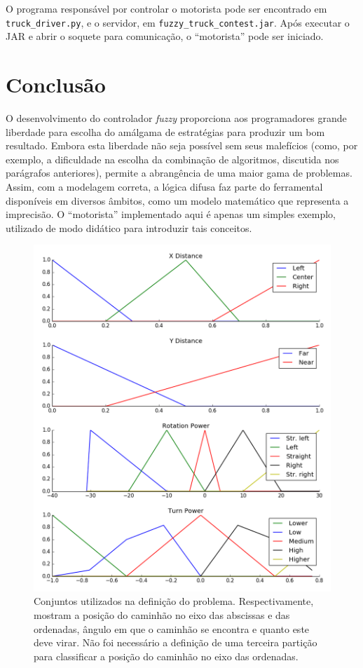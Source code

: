 \documentclass{article}
\begin{document}
O programa responsável por controlar o motorista pode ser encontrado em
\texttt{truck\_driver.py}, e o servidor, em \texttt{fuzzy\_truck\_contest.jar}.
Após executar o JAR e abrir o soquete para comunicação, o ``motorista'' pode
ser iniciado.

\section{Conclusão}

O desenvolvimento do controlador \emph{fuzzy} proporciona aos programadores
grande liberdade para escolha do amálgama de estratégias para produzir um bom
resultado. Embora esta liberdade não seja possível sem seus malefícios (como,
por exemplo, a dificuldade na escolha da combinação de algoritmos, discutida
nos parágrafos anteriores), permite a abrangência de uma maior gama de
problemas. Assim, com a modelagem correta, a lógica difusa faz parte do
ferramental disponíveis em diversos âmbitos, como um modelo matemático que
representa a imprecisão. O ``motorista'' implementado aqui é apenas um simples
exemplo, utilizado de modo didático para introduzir tais conceitos.

\begin{figure}[ht]
    \centering
    \includegraphics[scale=0.5]{figure_1.png}
    \caption{Conjuntos utilizados na definição do problema. Respectivamente,
        mostram a posição do caminhão no eixo das abscissas e das ordenadas,
        ângulo em que o caminhão se encontra e quanto este deve virar. Não
        foi necessário a definição de uma terceira partição para classificar
        a posição do caminhão no eixo das ordenadas.}
    \label{fig01}
\end{figure}
\end{document}
